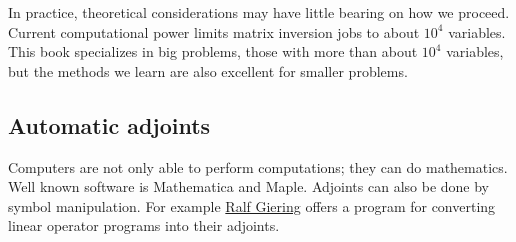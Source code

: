 \par
In practice, theoretical considerations may have little
bearing on how we proceed.
Current computational power limits matrix inversion
jobs to about $10^4$ variables.
This book specializes in big problems,
those with more than about $10^4$ variables,
but the methods we learn are also excellent for smaller problems.

\subsection{Automatic adjoints}
Computers are not only able to perform computations; they can do
mathematics.  Well known software is Mathematica and Maple.  Adjoints
can also be done by symbol manipulation.  For example
\href{http://www.fastopt.de/people/ralf/}{Ralf Giering}
offers a program for converting linear operator programs into their
adjoints.


